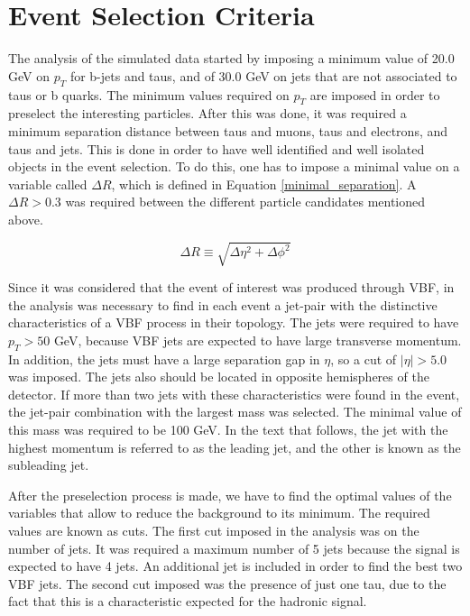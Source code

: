 \chapter{Event Selection Criteria}
\label{Event_selection_criteria_chapter}

The analysis of the simulated data started by imposing a minimum value of 20.0 GeV on $p_T$ for b-jets and taus, and of 30.0 GeV on jets that are not associated to taus or b quarks. The minimum values required on $p_T$ are imposed in order to preselect the interesting particles. After this was done, it was required a minimum separation distance between taus and muons, taus and electrons, and taus and jets. This is done in order to have well identified and well isolated objects in the event selection. To do this, one has to impose a minimal value on a variable called $\Delta R$, which is defined in Equation \ref{minimal_separation}. A $\Delta R > 0.3$ was required between the different particle candidates mentioned above. 

\begin{equation}
\Delta R \equiv \sqrt{\Delta \eta ^2 + \Delta \phi ^2}
\label{minimal_separation}
\end{equation}

Since it was considered that the event of interest was produced through VBF, in the analysis was necessary to find in each event a jet-pair with the distinctive characteristics of a VBF process in their topology. The jets were required to have $p_{T} > 50$ GeV, because VBF jets are expected to have large transverse momentum. In addition, the jets must have a large separation gap in $\eta$, so a cut of $|\eta| > 5.0$ was imposed. The jets also should be located in opposite hemispheres of the detector. If more than two jets with these characteristics were found in the event, the jet-pair combination with the largest mass was selected. The minimal value of this mass was required to be 100 GeV. In the text that follows, the jet with the highest momentum is referred to as the leading jet, and the other is known as the subleading jet.

After the preselection process is made, we have to find the optimal values of the variables that allow to reduce the background to its minimum. The required values are known as cuts. The first cut imposed in the analysis was on the number of jets. It was required a maximum number of 5 jets because the signal is expected to have 4 jets. An additional jet is included in order to find the best two VBF jets. The second cut imposed was the presence of just one tau, due to the fact that this is a characteristic expected for the hadronic signal. 

